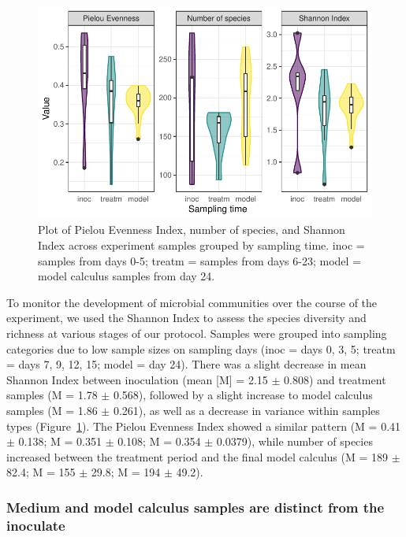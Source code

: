 \documentclass[
]{article}
\begin{document}
\begin{figure}

{\centering \includegraphics{index_files/figure-pdf/fig-diversity-byoc-1.pdf}

}

\caption{\label{fig-diversity-byoc}Plot of Pielou Evenness Index, number
of species, and Shannon Index across experiment samples grouped by
sampling time. inoc = samples from days 0-5; treatm = samples from days
6-23; model = model calculus samples from day 24.}

\end{figure}

To monitor the development of microbial communities over the course of
the experiment, we used the Shannon Index to assess the species
diversity and richness at various stages of our protocol. Samples were
grouped into sampling categories due to low sample sizes on sampling
days (inoc = days 0, 3, 5; treatm = days 7, 9, 12, 15; model = day 24).
There was a slight decrease in mean Shannon Index between inoculation
(mean {[}M{]} = 2.15 \(\pm\) 0.808) and treatment samples (M = 1.78
\(\pm\) 0.568), followed by a slight increase to model calculus samples
(M = 1.86 \(\pm\) 0.261), as well as a decrease in variance within
samples types (Figure~\ref{fig-diversity-byoc}). The Pielou Evenness
Index showed a similar pattern (M = 0.41 \(\pm\) 0.138; M = 0.351
\(\pm\) 0.108; M = 0.354 \(\pm\) 0.0379), while number of species
increased between the treatment period and the final model calculus (M =
189 \(\pm\) 82.4; M = 155 \(\pm\) 29.8; M = 194 \(\pm\) 49.2).

\hypertarget{medium-and-model-calculus-samples-are-distinct-from-the-inoculate}{%
\subsubsection{Medium and model calculus samples are distinct from the
inoculate}\label{medium-and-model-calculus-samples-are-distinct-from-the-inoculate}}
\end{document}
